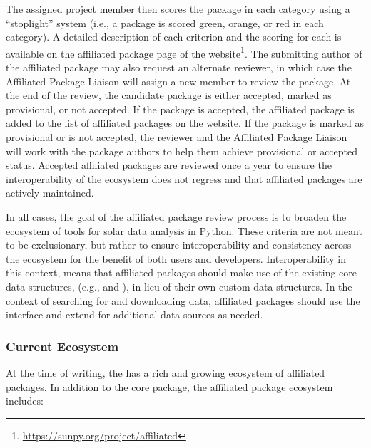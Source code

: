 The assigned project member then scores the package in each category using a \enquote{stoplight} system (i.e., a package is scored green, orange, or red in each category).
A detailed description of each criterion and the scoring for each is available on the affiliated package page of the \sunpyproj website\footnote{\url{https://sunpy.org/project/affiliated}}.
The submitting author of the affiliated package may also request an alternate reviewer, in which case the Affiliated Package Liaison will assign a new \sunpyproj member to review the package.
At the end of the review, the candidate package is either accepted, marked as provisional, or not accepted.
If the package is accepted, the affiliated package is added to the list of affiliated packages on the \sunpyproj website.
If the package is marked as provisional or is not accepted, the reviewer and the Affiliated Package Liaison will work with the package authors to help them achieve provisional or accepted status.
Accepted affiliated packages are reviewed once a year to ensure the interoperability of the ecosystem does not regress and that affiliated packages are actively maintained.

In all cases, the goal of the affiliated package review process is to broaden the ecosystem of tools for solar data analysis in Python.
These criteria are not meant to be exclusionary, but rather to ensure interoperability and consistency across the ecosystem for the benefit of both users and developers.
Interoperability in this context, means that affiliated packages should make use of the existing \sunpypkg core data structures, (e.g.,  and ), in lieu of their own custom data structures.
In the context of searching for and downloading data, affiliated packages should use the \Fido interface and extend \Fido for additional data sources as needed.

\subsubsection{Current Ecosystem}
\label{sssec:current-ecosystem}

At the time of writing, the \sunpyproj has a rich and growing ecosystem of affiliated packages.
In addition to the \sunpypkg core package, the affiliated package ecosystem includes:

